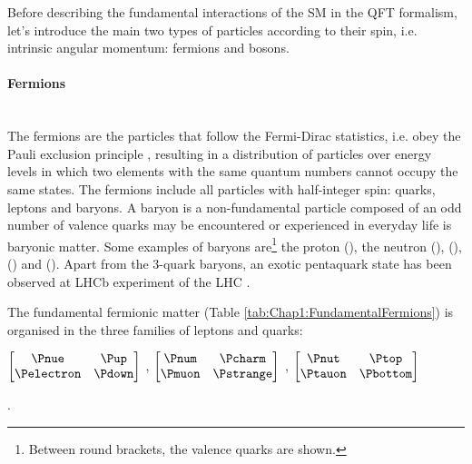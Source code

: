 


Before describing the fundamental interactions of the SM in the QFT formalism, let's introduce the main two types of particles according 
to their spin, i.e. intrinsic angular momentum: fermions and bosons.

\paragraph{Fermions}\mbox{}\\
The fermions are the particles that follow the Fermi-Dirac statistics, i.e. obey the Pauli exclusion principle \cite{10230794692Dirac}, resulting 
in a distribution of particles over energy levels in which two elements with the same quantum numbers cannot occupy the same states.
The fermions include all particles with half-integer spin: quarks, leptons and baryons.
A baryon is a non-fundamental particle composed of an odd number of valence quarks
may be encountered or experienced in everyday life is baryonic matter. Some examples of baryons are\footnote{Between round brackets, the valence quarks are shown.} the proton (\Pup\Pup\Pdown), the 
neutron (\Pdown\Pdown\Pup), \PLambda (\Pup\Pdown\Pstrange), \PLambdac (\Pup\Pdown\Pcharm) and \PSigmaplus (\Pup\Pup\Pstrange).
Apart from the 3-quark baryons, an exotic pentaquark state has been observed at LHCb experiment of the LHC \cite{LHCb:2019kea}. 


The fundamental fermionic matter (Table \ref{tab:Chap1:FundamentalFermions}) is organised in the three families of leptons and quarks:

\begin{center}
$\begin{bmatrix}
\Pnue & \Pup \\
\Pelectron & \Pdown 
\end{bmatrix}$
,
$\begin{bmatrix}
\Pnum & \Pcharm \\
\Pmuon & \Pstrange 
\end{bmatrix}$
,
$\begin{bmatrix}
\Pnut & \Ptop \\
\Ptauon & \Pbottom 
\end{bmatrix}$
\end{center}.

